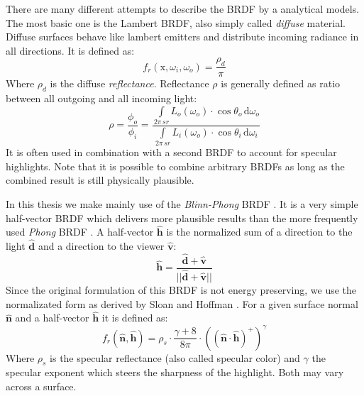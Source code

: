 \documentclass[thesis.tex]{subfiles}
\begin{document}
There are many different attempts to describe the BRDF by a analytical models.
The most basic one is the Lambert BRDF, also simply called \emph{diffuse} material.
Diffuse surfaces behave like lambert emitters and distribute incoming radiance in all directions.
It is defined as:
\begin{equation}
f_r(\mathrm{x}, \omega_i, \omega_o) = \frac{\rho_d}{\pi}
\end{equation}
Where $\rho_d$ is the diffuse \emph{reflectance}.
Reflectance $\rho$ is generally defined as ratio between all outgoing and all incoming light:
\begin{equation}
\rho = \frac{\phi_o}{\phi_i} = \frac{\int\limits_{2\pi\,sr} L_o(\omega_o)\cdot \cos\theta_o  \, \mathrm{d}\omega_o}{\int\limits_{2\pi\,sr} L_i(\omega_o)\cdot \cos\theta_i  \, \mathrm{d}\omega_i}
\end{equation}
It is often used in combination with a second BRDF to account for specular highlights.
Note that it is possible to combine arbitrary BRDFs as long as the combined result is still physically plausible.

In this thesis we make mainly use of the \emph{Blinn-Phong} BRDF \cite{bib:blinnphongbrdf}.
It is a very simple half-vector BRDF which delivers more plausible results than the more frequently used \emph{Phong} BRDF \cite[p.~251f]{bib:RealtimeRenderingBook}.
A half-vector $\hat{\mathbf{h}}$ is the normalized sum of a direction to the light $\hat{\mathbf{d}}$ and a direction to the viewer $\hat{\mathbf{v}}$:
\begin{equation}
\hat{\mathbf{h}} = \frac{\hat{\mathbf{d}} + \hat{\mathbf{v}}}{||\hat{\mathbf{d}} + \hat{\mathbf{v}}||}
\end{equation}
Since the original formulation of this BRDF is not energy preserving, we use the normalizated form as derived by Sloan and Hoffman \cite[p.~257]{bib:RealtimeRenderingBook}.
For a given surface normal $\hat{\mathbf{n}}$ and a half-vector $\hat{\mathbf{h}}$ it is defined as:
\begin{equation}
f_r(\hat{\mathbf{n}}, \hat{\mathbf{h}}) = \rho_s \cdot \frac{\gamma + 8}{8\pi} \cdot ((\hat{\mathbf{n}} \cdot \hat{\mathbf{h}})^+)^\gamma
\end{equation}
Where $\rho_s$ is the specular reflectance (also called specular color) and $\gamma$ the specular exponent which steers the sharpness of the highlight.
Both may vary across a surface.
\end{document}
